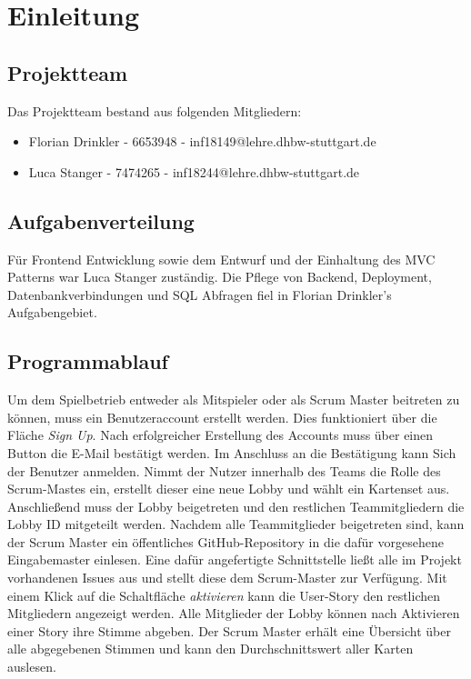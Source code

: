 
\chapter{Einleitung}\label{ch:einleitung}
\section{Projektteam}\label{sec:projektteam}
Das Projektteam bestand aus folgenden Mitgliedern:
\begin{itemize}
	\item Florian Drinkler - 6653948 - inf18149@lehre.dhbw-stuttgart.de
	\item Luca Stanger - 7474265 - inf18244@lehre.dhbw-stuttgart.de
\end{itemize}
\section{Aufgabenverteilung}\label{sec:aufgabenverteilung}
Für Frontend Entwicklung sowie dem Entwurf und der Einhaltung des MVC Patterns war Luca Stanger zuständig. Die Pflege von Backend, Deployment, Datenbankverbindungen und SQL Abfragen fiel in Florian Drinkler's Aufgabengebiet. 
\section{Programmablauf}\label{sec:programmablauf}
Um dem Spielbetrieb entweder als Mitspieler oder als Scrum Master beitreten zu können, muss ein Benutzeraccount erstellt werden. Dies funktioniert über die Fläche \emph{Sign Up}. Nach erfolgreicher Erstellung des Accounts muss über einen Button die E-Mail bestätigt werden. Im Anschluss an die Bestätigung kann Sich der Benutzer anmelden. Nimmt der Nutzer innerhalb des Teams die Rolle des Scrum-Mastes ein, erstellt dieser eine neue Lobby und wählt ein Kartenset aus. Anschließend muss der Lobby beigetreten und den restlichen Teammitgliedern die Lobby ID mitgeteilt werden. Nachdem alle Teammitglieder beigetreten sind, kann der Scrum Master ein öffentliches GitHub-Repository in die dafür vorgesehene Eingabemaster einlesen. Eine dafür angefertigte Schnittstelle ließt alle im Projekt vorhandenen Issues aus und stellt diese dem Scrum-Master zur Verfügung. Mit einem Klick auf die Schaltfläche \emph{aktivieren} kann die User-Story den restlichen Mitgliedern angezeigt werden. Alle Mitglieder der Lobby können nach Aktivieren einer Story ihre Stimme abgeben. Der Scrum Master erhält eine Übersicht über alle abgegebenen Stimmen und kann den Durchschnittswert aller Karten auslesen.